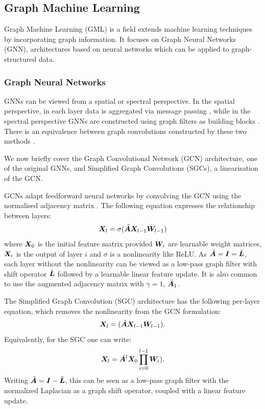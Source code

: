 \subsection{Graph Machine Learning}
Graph Machine Learning (GML) is a field extends machine learning techniques by incorporating graph information. It focuses on Graph Neural Networks (GNN), architectures based on neural networks which can be applied to graph-structured data.
\subsubsection{Graph Neural Networks} \label{sec:GNN_background}
GNNs can be viewed from a spatial or spectral perspective. In the spatial perspective, in each layer data is aggregated via message passing \cite[Section 5.3]{bronstein2021geometric}, while in the spectral perspective GNNs are constructed using graph filters as building blocks \cite{gama2018convolutional}. There is an equivalence between graph convolutions constructed by these two methods \cite{balcilar2020bridging}.

We now briefly cover the Graph Convolutional Network (GCN) architecture, one of the original GNNs, and Simplified Graph Convolutions (SGCs), a linearisation of the GCN.

GCNs adapt feedforward neural networks by convolving the 
GCN using the normalised adjacency matrix \cite{kipf2016semi}. The following equation expresses the relationship between layers:
\begin{equation}
    \bm{X}_{l} = \sigma(\tilde{\bm{A}}\bm{X}_{l-1}\bm{W}_{l-1})
\end{equation}
where $\bm{X}_{0}$ is the initial feature matrix provided $\bm{W}_{i}$ are learnable weight matrices, $\bm{X}_{i}$ is the output of layer $i$ and $\sigma$ is a nonlinearity like ReLU. As $\tilde{\bm{A}} = \bm{I} = \tilde{\bm{L}}$, each layer without the nonlinearity can be viewed as a low-pass graph filter with shift operator $\tilde{\bm{L}}$ followed by a learnable linear feature update. It is also common to use the augmented adjacency matrix with $\gamma=1$, $\tilde{\bm{A}}_{1}$.

The Simplified Graph Convolution (SGC) architecture has the following per-layer equation, which removes the nonlinearity from the GCN formulation:
\begin{equation}
    \bm{X}_{l} = (\tilde{\bm{A}}\bm{X}_{l-1}\bm{W}_{l-1}).
\end{equation}
Equivalently, for the SGC one can write:
\begin{equation}
    \bm{X}_{l} = \tilde{\bm{A}}^{l}\bm{X}_{0}\prod_{i=0}^{l-1}\bm{W}_{i}).
\end{equation}
Writing $\tilde{\bm{A}} = \bm{I} - \tilde{\bm{L}}$, this can be seen as a low-pass graph filter with the normalized Laplacian as a graph shift operator, coupled with a linear feature update.

